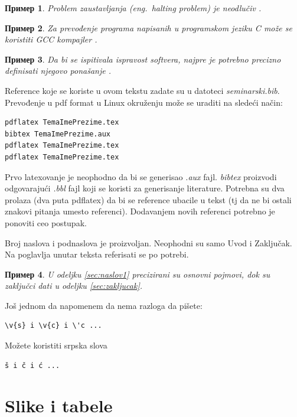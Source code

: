 \documentclass[a4paper]{article}
\newtheorem{primer}{Пример}[section] %
\begin{document}
\begin{primer}
Problem zaustavljanja (eng.~{\em halting problem}) je neodlučiv \cite{haltingproblem}.
\end{primer}

\begin{primer}
Za prevođenje programa napisanih u programskom jeziku C može se koristiti GCC kompajler \cite{gcc}.
\end{primer}

\begin{primer}
 Da bi se ispitivala ispravost softvera, najpre je potrebno precizno definisati njegovo ponašanje \cite{laski2009software}. 
\end{primer}

Reference koje se koriste u ovom tekstu zadate su u datoteci {\em seminarski.bib}. Prevođenje u pdf format u Linux okruženju može se uraditi na sledeći način:
\begin{verbatim}
pdflatex TemaImePrezime.tex 
bibtex TemaImePrezime.aux 
pdflatex TemaImePrezime.tex 
pdflatex TemaImePrezime.tex 
\end{verbatim}
Prvo latexovanje je neophodno da bi se generisao {\em .aux} fajl. {\em bibtex} proizvodi odgovarajući {\em .bbl} fajl koji se koristi za generisanje literature. 
Potrebna su dva prolaza (dva puta pdflatex) da bi se reference ubacile u tekst (tj da ne bi ostali znakovi pitanja umesto referenci). Dodavanjem novih referenci potrebno je ponoviti ceo postupak.  











Broj naslova i podnaslova je proizvoljan. Neophodni su samo Uvod i Zaključak. Na poglavlja unutar teksta referisati se po potrebi. 
\begin{primer}
U odeljku \ref{sec:naslov1} precizirani su osnovni pojmovi, dok su zaključci dati u odeljku \ref{sec:zakljucak}.
\end{primer}

Još jednom da napomenem da nema razloga da pišete:
\begin{verbatim}
\v{s} i \v{c} i \'c ...
\end{verbatim}
Možete koristiti srpska slova
\begin{verbatim}
š i č i ć ... 
\end{verbatim}



\section{Slike i tabele}
\label{slike_i_tabele}
\end{document}
